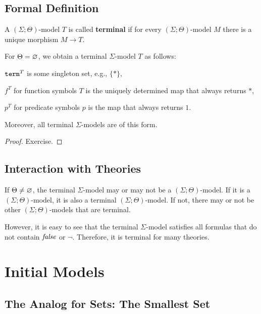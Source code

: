 \subsection{Formal Definition}

\begin{definition}
A $(\Sigma;\Theta)$-model $T$ is called \textbf{terminal} if for every $(\Sigma;\Theta)$-model $M$ there is a unique morphism $M\to T$.
\end{definition}

\begin{theorem}
For $\Theta=\varnothing$, we obtain a terminal $\Sigma$-model $T$ as follows:
\begin{compactitem}
 \item $\mathtt{term}^T$ is some singleton set, e.g., $\{\ast\}$,
 \item $f^T$ for function symbols $T$ is the uniquely determined map that always returns $\ast$,
 \item $p^T$ for predicate symbols $p$ is the map that always returns $1$.
\end{compactitem}
Moreover, all terminal $\Sigma$-models are of this form.
\end{theorem}
\begin{proof}
Exercise.
\end{proof}

\subsection{Interaction with Theories}

If $\Theta\neq\varnothing$, the terminal $\Sigma$-model may or may not be a $(\Sigma;\Theta)$-model.
If it is a $(\Sigma;\Theta)$-model, it is also a terminal $(\Sigma;\Theta)$-model.
If not, there may or not be other $(\Sigma;\Theta)$-models that are terminal.

However, it is easy to see that the terminal $\Sigma$-model satisfies all formulas that do not contain $\mathit{false}$ or $\neg$.
Therefore, it is terminal for many theories.

\section{Initial Models}\label{sec:univ:init}

\subsection{The Analog for Sets: The Smallest Set}


